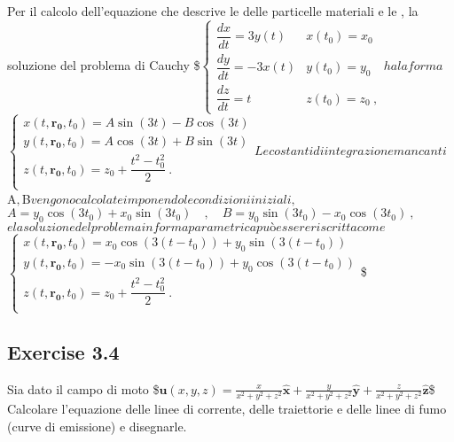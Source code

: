 \documentclass[letterpaper,10pt,italian]{jupyterBook}
\begin{document}
\sphinxAtStartPar
Per il calcolo dell’equazione che descrive le  delle
particelle materiali e le , la soluzione del problema
di Cauchy \$\(\begin{cases}
  \dfrac{dx}{dt} =  3y(t) & x(t_0) = x_0 \\
  \dfrac{dy}{dt} = -3x(t) & y(t_0) = y_0 \\
  \dfrac{dz}{dt} = t  &     z(t_0) = z_0 \ ,
 \end{cases}\)\( ha la forma \)\(\begin{cases}
  x(t,\bm{r_0},t_0) = A \sin(3t) - B \cos(3t) \\
  y(t,\bm{r_0},t_0) = A \cos(3t) + B \sin(3t) \\
  z(t,\bm{r_0},t_0) = z_0 + \dfrac{t^2 - t_0^2}{ 2 } \ .  \\
 \end{cases}\)\( Le costanti di integrazione mancanti \)A\(, \)B\( vengono
calcolate imponendo le condizioni iniziali,
\)\(A = y_0 \cos(3t_0) + x_0 \sin(3t_0) \quad , \quad
  B = y_0 \sin(3t_0) - x_0 \cos(3t_0) \ ,\)\( e la soluzione del problema
in forma parametrica può essere riscritta come \)\(\begin{cases}
  x(t,\bm{r_0},t_0) = x_0 \cos(3(t-t_0)) + y_0 \sin(3(t-t_0)) \\
  y(t,\bm{r_0},t_0) =-x_0 \sin(3(t-t_0)) + y_0 \cos(3(t-t_0)) \\
  z(t,\bm{r_0},t_0) = z_0 + \dfrac{t^2 - t_0^2}{ 2 } \ .  \\
 \end{cases}\)\$

\sphinxstepscope


\subsection{Exercise 3.4}
\label{\detokenize{polimi/fluidmechanics-ita/template/capitoli/03_cinematica/1203in_hints:exercise-3-4}}\label{\detokenize{polimi/fluidmechanics-ita/template/capitoli/03_cinematica/1203in_hints:fluid-mechanics-kinematics-ex-04}}\label{\detokenize{polimi/fluidmechanics-ita/template/capitoli/03_cinematica/1203in_hints::doc}}
\sphinxAtStartPar
Sia dato il campo di moto
\$\(\bm{u}(x,y,z) = \frac{x}{x^2 + y^2 + z^2} \bm{\hat{x}} +
                 \frac{y}{x^2 + y^2 + z^2} \bm{\hat{y}} +
                 \frac{z}{x^2 + y^2 + z^2} \bm{\hat{z}}\)\$ Calcolare
l’equazione delle linee di corrente, delle traiettorie e delle linee di
fumo (curve di emissione) e disegnarle.
\end{document}
